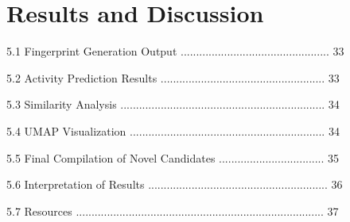 \chapter{Results and Discussion}
5.1 Fingerprint Generation Output ................................................ 33 

5.2 Activity Prediction Results ..................................................... 33 

5.3 Similarity Analysis .................................................................. 34 

5.4 UMAP Visualization ............................................................... 34 

5.5 Final Compilation of Novel Candidates .................................. 35 

5.6 Interpretation of Results .......................................................... 36 

5.7 Resources ................................................................................ 37